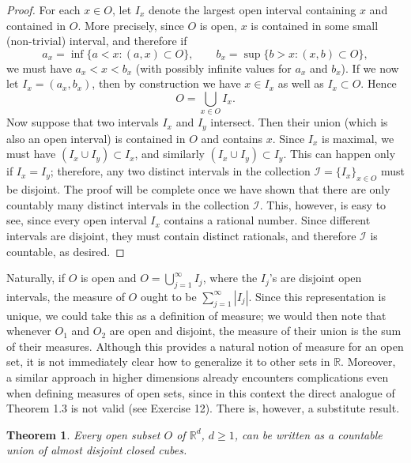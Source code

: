 \documentclass[11pt,openany]{book}
\newtheorem{theorem}{Theorem}[section]
\begin{document}
\begin{proof}
For each $x\in O$, let $I_x$ denote the largest open interval containing $x$ and contained in $O$. More precisely, since $O$ is open, $x$ is contained in some small (non-trivial) interval, and therefore if
\[
 a_x=\inf\{a<x:(a,x)\subset O\},
 \qquad
 b_x=\sup\{b>x:(x,b)\subset O\},
\]
we must have $a_x<x<b_x$ (with possibly infinite values for $a_x$ and $b_x$). If we now let $I_x=(a_x,b_x)$, then by construction we have $x\in I_x$ as well as $I_x\subset O$. Hence
\[
 O=\bigcup_{x\in O}I_x.
\]
Now suppose that two intervals $I_x$ and $I_y$ intersect. Then their union (which is also an open interval) is contained in $O$ and contains $x$. Since $I_x$ is maximal, we must have $(I_x\cup I_y)\subset I_x$, and similarly $(I_x\cup I_y)\subset I_y$. This can happen only if $I_x=I_y$; therefore, any two distinct intervals in the collection $\mathcal I=\{I_x\}_{x\in O}$ must be disjoint. The proof will be complete once we have shown that there are only countably many distinct intervals in the collection $\mathcal I$. This, however, is easy to see, since every open interval $I_x$ contains a rational number. Since different intervals are disjoint, they must contain distinct rationals, and therefore $\mathcal I$ is countable, as desired.
\end{proof}

Naturally, if $O$ is open and $O=\bigcup_{j=1}^{\infty}I_j$, where the $I_j$'s are disjoint open intervals, the measure of $O$ ought to be $\sum_{j=1}^{\infty}|I_j|$. Since this representation is unique, we could take this as a definition of measure; we would then note that whenever $O_1$ and $O_2$ are open and disjoint, the measure of their union is the sum of their measures. Although this provides a natural notion of measure for an open set, it is not immediately clear how to generalize it to other sets in $\mathbb{R}$. Moreover, a similar approach in higher dimensions already encounters complications even when defining measures of open sets, since in this context the direct analogue of Theorem 1.3 is not valid (see Exercise 12). There is, however, a substitute result.

\begin{theorem}
Every open subset $O$ of $\mathbb{R}^d$, $d\ge1$, can be written as a countable union of almost disjoint closed cubes.
\end{theorem}
\end{document}
